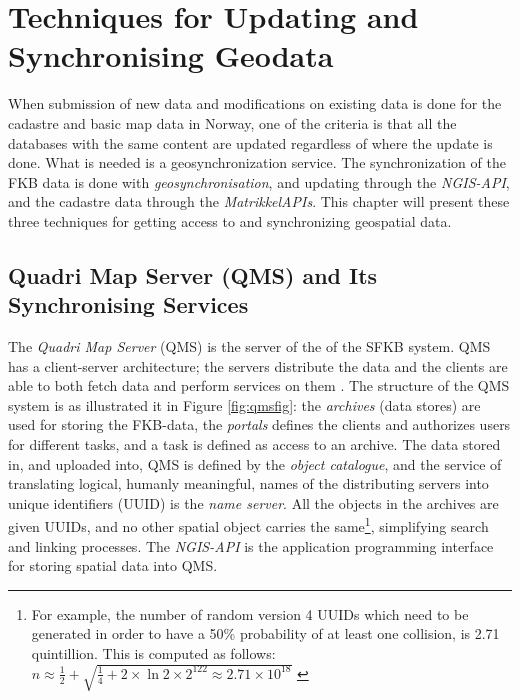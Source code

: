 \chapter{Techniques for Updating and Synchronising Geodata} \label{chap:tech}
When submission of new data and modifications on existing data is done for the cadastre and basic map data in Norway, one of the criteria is that all the databases with the same content are updated regardless of where the update is done. What is needed is a geosynchronization service. The synchronization of the FKB data is done with \textit{geosynchronisation}, and updating through the \textit{NGIS-API}, and the cadastre data through the \textit{MatrikkelAPIs}.  This chapter will present these three techniques for getting access to and synchronizing geospatial data.  


\section{Quadri Map Server (QMS) and Its Synchronising Services}\label{ngis}
The \textit{Quadri Map Server} (QMS) is the server of the of the SFKB system. 
QMS has a client-server architecture; the servers distribute the data and the clients are able to both fetch data and perform services on them \citep{NorkartAS2010}. 
The structure of the QMS system
is as \cite{Kartverket2017} illustrated it in Figure \ref{fig:qmsfig}: the \textit{archives} (data stores) are used for storing the FKB-data, the \textit{portals} defines the clients and authorizes users for different tasks, and a task is defined as access to an archive. The data stored in, and uploaded into, QMS is defined by the \textit{object catalogue}, and the service of translating logical, humanly meaningful, names of the distributing servers into unique identifiers (UUID) is the \textit{name server}. All the objects in the archives are given UUIDs, and no other spatial object carries the same\footnote{For example, the number of random version 4 UUIDs which need to be generated in order to have a 50\% probability of at least one collision, is 2.71 quintillion. This is computed as follows: $ n \approx \frac{1}{2} + \sqrt{\frac{1}{4}+2 \times \ln{2} \times  2^{122} \approx 2.71 \times 10^{18}} $ \citep{Eggan2017}}, simplifying search and linking processes.
The \textit{NGIS-API} is the application programming interface for storing spatial data into QMS.%

